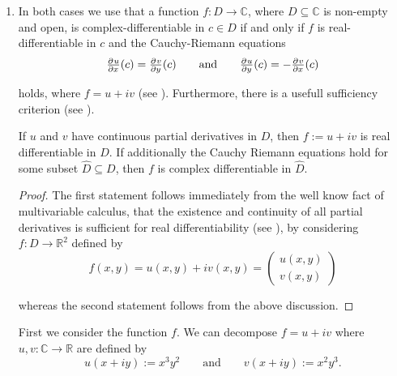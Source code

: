 \begin{enumerate}[label = \textbf{Exercise \arabic*.},wide = 0pt, itemsep=1.5ex]
	\begin{proof}
		$h$ aswell as $h^{-1}$ are well-defined rational functions, hence holomorphic in their respective domains.		
	\end{proof}
	
	By lemma \ref{lem:well_defined}, \ref{lem:invertible} and \ref{lem:holo} we conclude that the Cayley-map is biholomorphic. 

\item In both cases we use that a function $f: D \to \mathbb{C}$, where $D \subseteq \mathbb{C}$ is non-empty and open, is complex-differentiable in $c \in D$ if and only if $f$ is real-differentiable in $c$ and the Cauchy-Riemann equations 
	\begin{equation*}
		\pd{u}{x}(c) = \pd{v}{y}(c) \qquad \text{and} \qquad \pd{u}{y}(c) = -\pd{v}{x}(c)
	\end{equation*}

	\noindent holds, where $f = u + iv$ (see \cite[47]{remmert2002funktionentheorie}). Furthermore, there is a usefull sufficiency criterion (see \cite[48]{remmert2002funktionentheorie}).	
	\begin{lemma}
		If $u$ and $v$ have continuous partial derivatives in $D$, then $f := u + iv$ is real differentiable in $D$. If additionally the Cauchy Riemann equations hold for some subset $\hat{D} \subseteq D$, then $f$ is complex differentiable in $\hat{D}$.
	\end{lemma}

	\begin{proof}
		The first statement follows immediately from the well know fact of multivariable calculus, that the existence and continuity of all partial derivatives is sufficient for real differentiability (see \cite[457]{zorich:analysis_I:2004}), by considering $f: D \to \mathbb{R}^2$ defined by 
		\begin{equation*}
			f(x,y) = u(x,y) + iv(x,y) = \begin{pmatrix}
				u(x,y)\\
				v(x,y)
			\end{pmatrix}
		\end{equation*}
	
		\noindent whereas the second statement follows from the above discussion.
	\end{proof}

	First we consider the function $f$. We can decompose $f = u + iv$ where $u,v: \mathbb{C} \to \mathbb{R}$ are defined by
	\begin{equation}
		u(x + iy) := x^3y^2 \qquad \text{and} \qquad v(x + iy) := x^2y^3.	
	\end{equation}


\end{enumerate}
